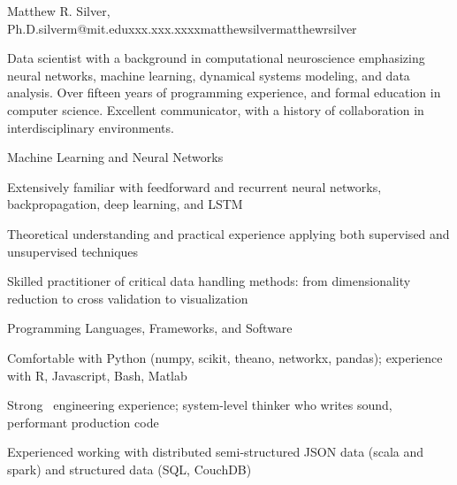 \documentclass{report}
\begin{document}

  \begin{resume_header}{Matthew R. Silver, Ph.D.}{silverm@mit.edu}{xxx.xxx.xxxx}{matthewsilver}{matthewrsilver}

    Data scientist with a background in computational neuroscience emphasizing neural networks, machine learning, dynamical systems modeling, and data analysis. Over fifteen years of programming experience, and formal education in computer science. Excellent communicator, with a history of collaboration in interdisciplinary environments.

  \end{resume_header}





  \begin{skillset}{Machine Learning and Neural Networks}
    \item Extensively familiar with feedforward and recurrent neural networks, backpropagation, deep learning, and LSTM
    \item Theoretical understanding and practical experience applying both supervised and unsupervised techniques
    \item Skilled practitioner of critical data handling methods: from dimensionality reduction to cross validation to visualization
  \end{skillset}

  \begin{skillset}{Programming Languages, Frameworks, and Software}
    \item Comfortable with Python (numpy, scikit, theano, networkx, pandas); experience with R, Javascript, Bash, Matlab
    \item Strong \CC~engineering experience; system-level thinker who writes sound, performant production code
    \item Experienced working with distributed semi-structured JSON data (scala and spark) and structured data (SQL, CouchDB)
  \end{skillset}






\end{document}
